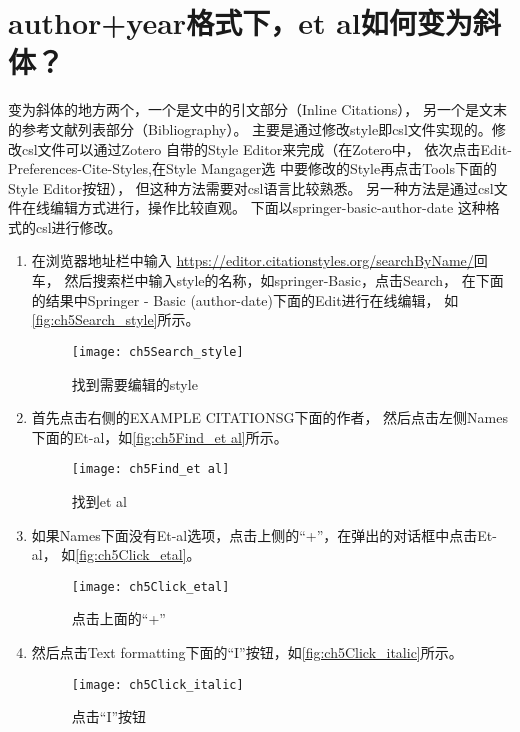 \documentclass[cn,11pt,chinese]{elegantbook}
\begin{document}
						
			 	
		\section{author+year格式下，et al如何变为斜体？}\label{sec:etal_italic}
			变为斜体的地方两个，一个是文中的引文部分（Inline Citations），
			另一个是文末的参考文献列表部分（Bibliography）。
			主要是通过修改style即csl文件实现的。修改csl文件可以通过Zotero
			自带的Style Editor来完成（在Zotero中，
			依次点击Edit-Preferences-Cite-Styles,在Style Mangager选
			中要修改的Style再点击Tools下面的Style Editor按钮），
			但这种方法需要对csl语言比较熟悉。
			另一种方法是通过csl文件在线编辑方式进行，操作比较直观。
			下面以springer-basic-author-date 这种格式的csl进行修改。	
			\begin{enumerate}
				\item 
				在浏览器地址栏中输入
				\href{https://editor.citationstyles.org/searchByName/}
				{https://editor.citationstyles.org/searchByName/}回车，
				然后搜索栏中输入style的名称，如springer-Basic，点击Search，
				在下面的结果中Springer - Basic (author-date)下面的Edit进行在线编辑，
				如\autoref{fig:ch5Search_style}所示。
				\begin{figure}[htbp]
					\centering
					\texttt{[image: ch5Search\_style]}
					\caption{找到需要编辑的style}
					\label{fig:ch5Search_style}
				\end{figure}
			\item 首先点击右侧的EXAMPLE CITATIONSG下面的作者，
			然后点击左侧Names下面的Et-al，如\autoref{fig:ch5Find_et al}所示。
				\begin{figure}[htbp]
					\centering
					\texttt{[image: ch5Find\_et al]}
					\caption{找到et al}
					\label{fig:ch5Find_et al}
				\end{figure}
			\item 如果Names下面没有Et-al选项，点击上侧的“+”，在弹出的对话框中点击Et-al，
			如\autoref{fig:ch5Click_etal}。
				\begin{figure}[htbp]
					\centering
					\texttt{[image: ch5Click\_etal]}
					\caption{点击上面的“+”}
					\label{fig:ch5Click_etal}
				\end{figure}
			\item 然后点击Text formatting下面的“I”按钮，如\autoref{fig:ch5Click_italic}所示。
				\begin{figure}[htbp]
					\centering
					\texttt{[image: ch5Click\_italic]}
					\caption{点击“I”按钮}
					\label{fig:ch5Click_italic}
				\end{figure}
			\end{enumerate}
\end{document}
